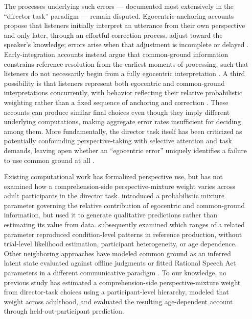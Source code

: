 \documentclass[11pt]{article}
\begin{document}
The processes underlying such errors --- documented most extensively in the
``director task'' paradigm \citep{keysar2000} --- remain disputed.
Egocentric-anchoring accounts propose that listeners initially interpret an
utterance from their own perspective and only later, through an effortful
correction process, adjust toward the speaker's knowledge; errors arise when
that adjustment is incomplete or delayed \citep{keysar2000,epley2004}.
Early-integration accounts instead argue that common-ground information
constrains reference resolution from the earliest moments of processing, such
that listeners do not necessarily begin from a fully egocentric interpretation
\citep{hanna2003}. A third possibility is that listeners represent both
egocentric and common-ground interpretations concurrently, with behavior
reflecting their relative probabilistic weighting rather than a fixed sequence
of anchoring and correction \citep{heller2016}. These accounts can produce
similar final choices even though they imply different underlying computations,
making aggregate error rates insufficient for deciding among them. More
fundamentally, the director task itself has been criticized as potentially
confounding perspective-taking with selective attention and task demands,
leaving open whether an ``egocentric error'' uniquely identifies a failure to
use common ground at all \citep{rubiofernandez2017}.

Existing computational work has formalized perspective use, but has not examined how a comprehension-side perspective-mixture weight varies across adult participants in the director task. \citet{heller2016}
introduced a probabilistic mixture parameter governing the relative contribution
of egocentric and common-ground information, but used it to generate qualitative
predictions rather than estimating its value from data. \citet{mozuraitis2018}
subsequently examined which ranges of a related parameter reproduced
condition-level patterns in reference production, without trial-level likelihood
estimation, participant heterogeneity, or age dependence. Other neighboring
approaches have modeled common ground as an inferred latent state evaluated
against offline judgments \citep{rubiofernandez2018} or fitted Rational Speech
Act parameters in a different communicative paradigm \citep{hawkins2021}. To our
knowledge, no previous study has estimated a comprehension-side
perspective-mixture weight from director-task choices using a participant-level
hierarchy, modeled that weight across adulthood, and evaluated the resulting
age-dependent account through held-out-participant prediction.
\end{document}
